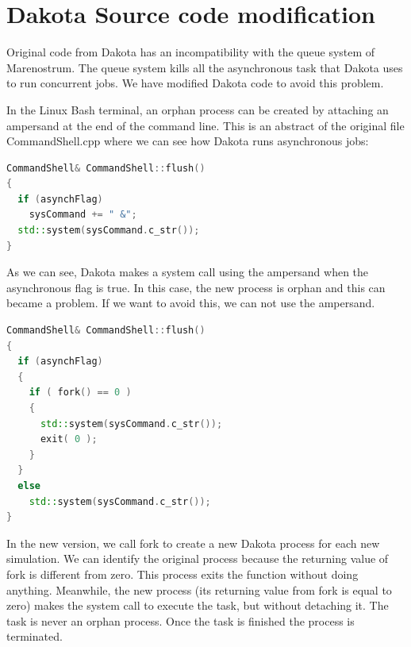 \documentclass[12pt,a4paper,article]{memoir}
\begin{document}
\appendix

\chapter{Dakota Source code modification}
\label{chapter:CodeMod}

Original code from Dakota has an incompatibility with the queue system of Marenostrum. The queue system kills all the asynchronous task that Dakota uses to run concurrent jobs. We have modified Dakota code to avoid this problem.

In the Linux Bash terminal, an orphan process can be created by attaching an ampersand at the end of the command line. This is an abstract of the original file CommandShell.cpp where we can see how Dakota runs asynchronous jobs:

\begin{lstlisting}[style=MyCodeStyle,language=C++]
CommandShell& CommandShell::flush()
{
  if (asynchFlag)
    sysCommand += " &";
  std::system(sysCommand.c_str());
}
\end{lstlisting}

As we can see, Dakota makes a system call using the ampersand when the asynchronous flag is true. In this case, the new process is orphan and this can became a problem. If we want to avoid this, we can not use the ampersand.

\begin{lstlisting}[style=MyCodeStyle,language=C++]
CommandShell& CommandShell::flush()
{
  if (asynchFlag)
  {
    if ( fork() == 0 )
    {
      std::system(sysCommand.c_str());
      exit( 0 );
    }
  }
  else
    std::system(sysCommand.c_str());
}
\end{lstlisting}

In the new version, we call fork to create a new Dakota process for each new simulation. We can identify the original process because the returning value of fork is different from zero. This process exits the function without doing anything. Meanwhile, the new process (its returning value from fork is equal to zero) makes the system call to execute the task, but without detaching it. The task is never an orphan process. Once the task is finished the process is terminated.
\end{document}
